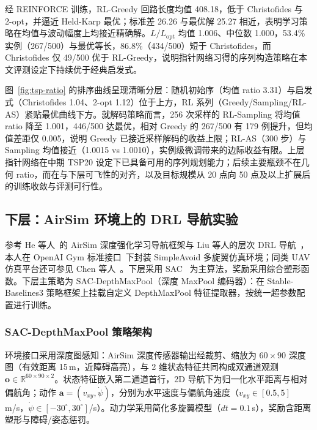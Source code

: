 经 REINFORCE 训练，RL-Greedy 回路长度均值 408.18，低于 Christofides 与 2-opt，并逼近 Held-Karp 最优；标准差 26.26 与最优解 25.27 相近，表明学习策略在均值与波动幅度上均接近精确解。$L/L_{\mathrm{opt}}$ 均值 1.006、中位数 1.000，53.4\% 实例（267/500）与最优等长，86.8\%（434/500）短于 Christofides，而 Christofides 仅 49/500 优于 RL-Greedy，说明指针网络习得的序列构造策略在本文评测设定下持续优于经典启发式。

图~\ref{fig:tsp-ratio} 的排序曲线呈现清晰分层：随机初始序（均值 ratio 3.31）与启发式（Christofides 1.04、2-opt 1.12）位于上方，RL 系列（Greedy/Sampling/RL-AS）紧贴最优曲线下方。就解码策略而言，256 次采样的 RL-Sampling 将均值 ratio 降至 1.001，446/500 达最优，相对 Greedy 的 267/500 有 179 例提升，但均值差距仅 0.005，说明 Greedy 已接近采样解码的收益上限；RL-AS（300 步）与 Sampling 均值接近（1.0015 vs 1.0010），实例级微调带来的边际收益有限。上层指针网络在中期 TSP20 设定下已具备可用的序列规划能力；后续主要瓶颈不在几何 ratio，而在与下层可飞性的对齐，以及目标规模从 20 点向 50 点及以上扩展后的训练收敛与评测可行性。

\subsection{下层：AirSim 环境上的 DRL 导航实验}

参考 He 等人~\cite{he2021explainable}的 AirSim 深度强化学习导航框架与 Liu 等人的层次 DRL 导航~\cite{liu2022hrl}，本人在 OpenAI Gym 标准接口~\cite{brockman2016gym}下封装 SimpleAvoid 多旋翼仿真环境；同类 UAV 仿真平台还可参见 Chen 等人~\cite{chen2022uavsim}。下层采用 SAC~\cite{haarnoja2018sac,fang2024sac} 为主算法，奖励采用综合塑形函数。下层主策略为 SAC-DepthMaxPool（深度 MaxPool 编码器）：在 Stable-Baselines3 策略框架上挂载自定义 DepthMaxPool 特征提取器，按统一超参数配置进行训练。

\subsubsection{SAC-DepthMaxPool 策略架构}

环境接口采用深度图感知：AirSim 深度传感器输出经裁剪、缩放为 $60\times90$ 深度图（有效距离 15\,m，近障碍高亮），与 2 维状态特征共同构成双通道观测 $\mathbf{o}\in\mathbb{R}^{60\times90\times2}$。状态特征嵌入第二通道首行，2D 导航下为归一化水平距离与相对偏航角；动作 $\mathbf{a}=(v_{xy},\dot\psi)$，分别为水平速度与偏航角速度（$v_{xy}\in[0.5,5]$\,m/s，$\dot\psi\in[-30^\circ,30^\circ]$/s）。动力学采用简化多旋翼模型（$dt=0.1$\,s），奖励含距离塑形与障碍/姿态惩罚。


